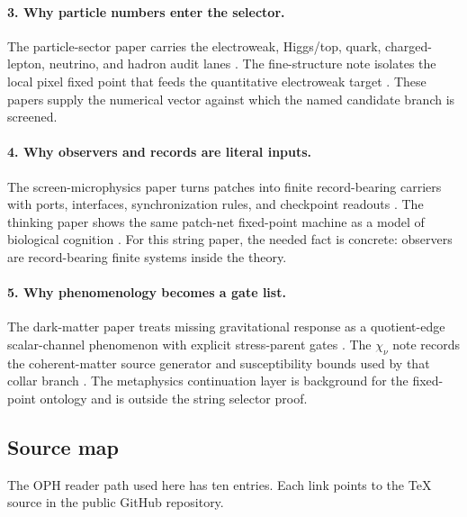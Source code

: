 \documentclass[11pt]{article}
\theoremstyle{remark}
\theoremstyle{plain}
\begin{document}
\paragraph{3. Why particle numbers enter the selector.}
The particle-sector paper carries the electroweak, Higgs/top, quark, charged-lepton, neutrino, and
hadron audit lanes \cite{OPHParticleZoo}. The fine-structure note isolates the local pixel fixed
point that feeds the quantitative electroweak target \cite{OPHFineStructure}. These papers supply
the numerical vector against which the named candidate branch is screened.

\paragraph{4. Why observers and records are literal inputs.}
The screen-microphysics paper turns patches into finite record-bearing carriers with ports,
interfaces, synchronization rules, and checkpoint readouts \cite{OPHScreenMicrophysics}. The
thinking paper shows the same patch-net fixed-point machine as a model of biological cognition
\cite{OPHThinkingPatchNet}. For this string paper, the needed fact is concrete: observers are
record-bearing finite systems inside the theory.

\paragraph{5. Why phenomenology becomes a gate list.}
The dark-matter paper treats missing gravitational response as a quotient-edge scalar-channel
phenomenon with explicit stress-parent gates \cite{OPHDarkMatter}. The \(\chi_\nu\) note records
the coherent-matter source generator and susceptibility bounds used by that collar branch
\cite{OPHChiNuBounds}. The metaphysics continuation layer is background for the fixed-point
ontology and is outside the string selector proof.

\subsection{Source map}

The OPH reader path used here has ten entries. Each link points to the TeX source in the public
GitHub repository.
\end{document}
